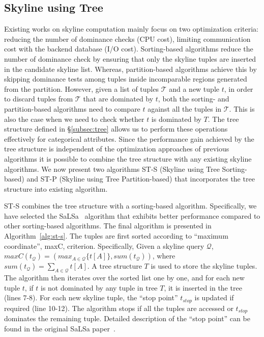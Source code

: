 \subsection{Skyline using Tree}\label{sec:ST}
Existing works on skyline computation mainly focus on two optimization criteria: reducing the number of dominance checks (CPU cost), limiting communication cost with the backend database (I/O cost). Sorting-based algorithms reduce the number of dominance check by ensuring that only the skyline tuples are inserted in the candidate skyline list. Whereas, partition-based algorithms achieve this by skipping dominance tests among tuples inside incomparable regions generated from the partition. However, given a list of tuples $\mathcal{T}$ and a new tuple $t$, in order to discard tuples from $\mathcal{T}$ that are dominated by $t$, both the sorting- and partition-based algorithms need to compare $t$ against all the tuples in $\mathcal{T}$. This is also the case when we need to check whether $t$ is dominated by $T$. The tree structure defined in \S\ref{subsec:tree} allows us to perform these operations effectively for categorical attributes. Since the performance gain achieved by the tree structure is independent of the optimization approaches of previous algorithms it is possible to combine the tree structure with any existing skyline algorithms. We now present two algorithms ST-S (Skyline using Tree Sorting-based) and ST-P (Skyline using Tree Partition-based) that incorporates the tree structure into existing algorithm.

\vspace{1mm}
 ST-S combines the tree structure with a sorting-based algorithm. Specifically, we have selected the SaLSa~\cite{bartolini2008efficient} algorithm that exhibits better performance compared to other sorting-based algorithms. The final algorithm is presented in Algorithm~\ref{alg:st-s}. The tuples are first sorted according to ``maximum coordinate'', maxC, criterion. Specifically, Given a skyline query $\mathcal{Q}$, $maxC(t_{\mathcal{Q}}) = (max_{A\in \mathcal{Q}}\{t[A]\}, sum(t_{\mathcal{Q}}))$, where $sum(t_{\mathcal{Q}}) = \sum_{A\in \mathcal{Q}} t[A]$. A tree structure $T$ is used to store the skyline tuples. 
The algorithm then iterates over the sorted list one by one, and for each new tuple $t$, if $t$ is not dominated by any tuple in tree $T$, it is inserted in the tree (lines 7-8). For each new skyline tuple, the ``stop point'' $t_{stop}$ is updated if required (line 10-12). The algorithm stops if all the tuples are accessed or $t_{stop}$ dominates the remaining tuple. Detailed description of the ``stop point'' can be found in the original SaLSa paper~\cite{bartolini2008efficient}.


